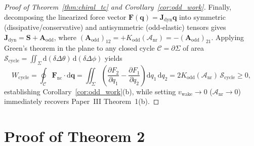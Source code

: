 \documentclass[11pt,letterpaper]{article}
\begin{document}
\begin{proof}[Proof of Theorem~\ref{thm:chiral_tc} and Corollary~\ref{cor:odd_work}]
Finally, decomposing the linearized force vector $\mathbf{F}(\mathbf{q}) = \mathbf{J}_{\mathrm{dyn}}\mathbf{q}$ into symmetric (dissipative/conservative) and antisymmetric (odd-elastic) tensors gives $\mathbf{J}_{\mathrm{dyn}} = \mathbf{S} + \mathbf{A}_{\mathrm{odd}}$, where $(\mathbf{A}_{\mathrm{odd}})_{12} = +K_{\mathrm{odd}}(\mathcal{A}_{\mathrm{nr}}) = -(\mathbf{A}_{\mathrm{odd}})_{21}$. Applying Green's theorem in the plane to any closed cycle $\mathcal{C} = \partial\Sigma$ of area $\mathcal{S}_{\mathrm{cycle}} = \iint_\Sigma \mathrm{d}(\delta\Delta\theta)\,\mathrm{d}(\delta\Delta\phi)$ yields
\begin{equation}
W_{\mathrm{cycle}} = \oint_{\mathcal{C}} \mathbf{F}_{\mathrm{nc}}\cdot \mathrm{d}\mathbf{q} = \iint_{\Sigma} \left(\frac{\partial F_2}{\partial q_1} - \frac{\partial F_1}{\partial q_2}\right)\mathrm{d}q_1\,\mathrm{d}q_2 = 2 K_{\mathrm{odd}}(\mathcal{A}_{\mathrm{nr}})\,\mathcal{S}_{\mathrm{cycle}} \ge 0,
\end{equation}
establishing Corollary~\ref{cor:odd_work}(b), while setting $v_{\mathrm{wake}} \to 0$ ($\mathcal{A}_{\mathrm{nr}} \to 0$) immediately recovers Paper~III Theorem~1(b).
\end{proof}

\section{Proof of Theorem 2}
\label{app:proof_thm2}
\end{document}
